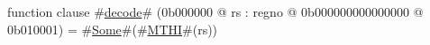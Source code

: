 function clause #\hyperref[zdecode]{decode}# (0b000000 @ rs : regno @ 0b000000000000000 @ 0b010001) =
  #\hyperref[zSome]{Some}#(#\hyperref[zMTHI]{MTHI}#(rs))
